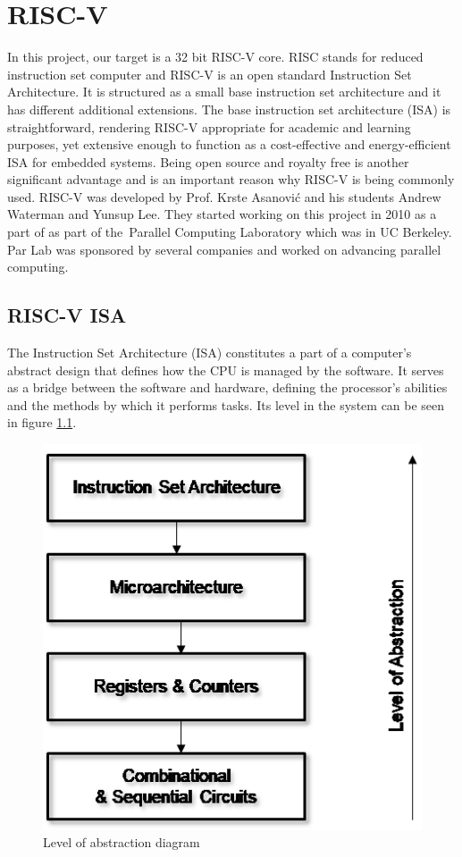 \clearpage
\chapter{RISC-V}\label{Ch8}
In this project, our target is a 32 bit RISC-V core. RISC stands for reduced instruction set computer and RISC-V is an open standard Instruction Set Architecture. \cite{riscvorgabout} It is structured as a small base instruction set architecture and it has different additional extensions. The base instruction set architecture (ISA) is straightforward, rendering RISC-V appropriate for academic and learning purposes, yet extensive enough to function as a cost-effective and energy-efficient ISA for embedded systems. \cite{watermanriscv} Being open source and royalty free is another significant advantage and is an important reason why RISC-V is being commonly used. 
RISC-V was developed by Prof. Krste Asanović and his students Andrew Waterman and Yunsup Lee. They started working on this project in 2010 as a part of as part of the Parallel Computing Laboratory which was in UC Berkeley. Par Lab was sponsored by several companies and worked on advancing parallel computing.

\section{RISC-V ISA}
The Instruction Set Architecture (ISA) constitutes a part of a computer’s abstract design that defines how the CPU is managed by the software. It serves as a bridge between the software and hardware, defining the processor’s abilities and the methods by which it performs tasks. Its level in the system can be seen in figure \ref{fig:level_of_abstraction_diagram}.
\begin{figure}
    \centering
    \includegraphics{riscv/level_of_abstraction_diagram.png}
    \caption{Level of abstraction diagram \cite{levelofabstrac}}
    \label{fig:level_of_abstraction_diagram}
\end{figure}


